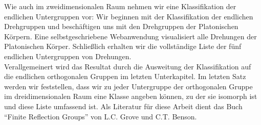 Wie auch im zweidimensionalen Raum nehmen wir eine Klassifikation der endlichen Untergruppen vor: Wir beginnen mit der Klassifikation der endlichen Drehgruppen und beschäftigen uns mit den Drehgruppen der Platonischen Körpern. Eine selbstgeschriebene Webanwendung visualisiert alle Drehungen der Platonischen Körper. Schließlich erhalten wir die vollständige Liste der fünf endlichen Untergruppen von Drehungen.\\
Verallgemeinert wird das Resultat durch die Ausweitung der Klassifikation auf die endlichen orthogonalen Gruppen im letzten Unterkapitel. Im letzten Satz werden wir feststellen, dass wir zu jeder Untergruppe der orthogonalen Gruppe im dreidimensionalen Raum eine Klasse angeben können, zu der sie isomorph ist und diese Liste umfassend ist.
Als Literatur für diese Arbeit dient das Buch \enquote{Finite Reflection Groups} von L.C. Grove und C.T. Benson.

